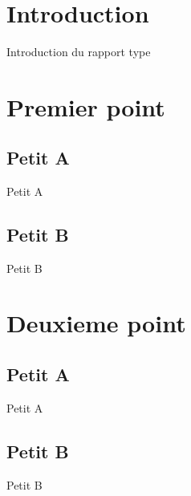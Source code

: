 \documentclass[11pt,a4paper]{article}
\begin{document}

\newpage
{}
\hfill \\

\newpage
\section{Introduction}
	Introduction du rapport type\\
\newpage
\section{Premier point}
	\subsection{Petit A}
	Petit A \\
	\subsection{Petit B}
	Petit B \\
	
\newpage
\section{Deuxieme point}
	\subsection{Petit A}
        Petit A \\
	\cite{1613041}
	\newpage
	\subsection{Petit B}
        Petit B \\

\newpage




 
\end{document}
